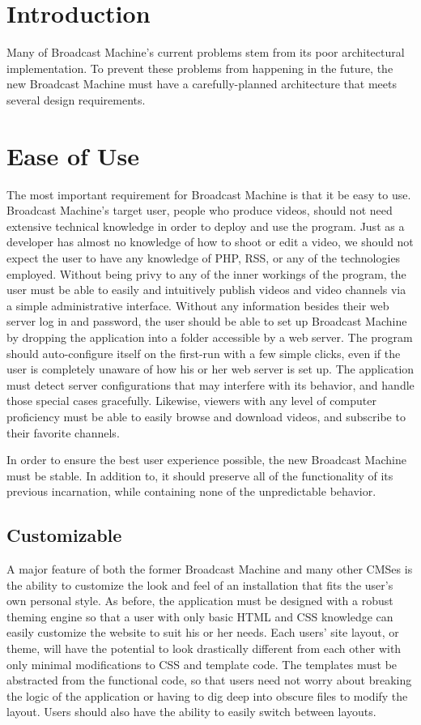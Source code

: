 \documentclass[a4paper,12pt]{report}
\begin{document}
\section{Introduction}
Many of Broadcast Machine's current problems stem from its poor architectural implementation. 
To prevent these problems from happening in the future, the new Broadcast Machine must have a carefully-planned architecture that meets several design requirements.

\section{Ease of Use}
The most important requirement for Broadcast Machine is that it be easy to use. 
Broadcast Machine's target user, people who produce videos, should not need extensive technical knowledge in order to deploy and use the program. 
Just as a developer has almost no knowledge of how to shoot or edit a video, we should not expect the user to have any knowledge of PHP, RSS, or any of the technologies employed. 
Without being privy to any of the inner workings of the program, the user must be able to easily and intuitively publish videos and video channels via a simple administrative interface. 
Without any information besides their web server log in and password, the user should be able to set up Broadcast Machine by dropping the application into a folder accessible by a web server. 
The program should auto-configure itself on the first-run with a few simple clicks, even if the user is completely unaware of how his or her web server is set up. 
The application must detect server configurations that may interfere with its behavior, and handle those special cases gracefully. 
Likewise, viewers with any level of computer proficiency must be able to easily browse and download videos, and subscribe to their favorite channels.

In order to ensure the best user experience possible, the new Broadcast Machine must be stable. In addition to, it should preserve all of the functionality of its previous incarnation, while containing none of the unpredictable behavior.

\subsection{Customizable} 
A major feature of both the former Broadcast Machine and many other CMSes is the ability to customize the look and feel of an installation that fits the user's own personal style. 
As before, the application must be designed with a robust theming engine so that a user with only basic HTML and CSS knowledge can easily customize the website to suit his or her needs. 
Each users' site layout, or theme, will have the potential to look drastically different from each other with only minimal modifications to CSS and template code. 
The templates must be abstracted from the functional code, so that users need not worry about breaking the logic of the application or having to dig deep into obscure files to modify the layout. 
Users should also have the ability to easily switch between layouts. 
\end{document}
